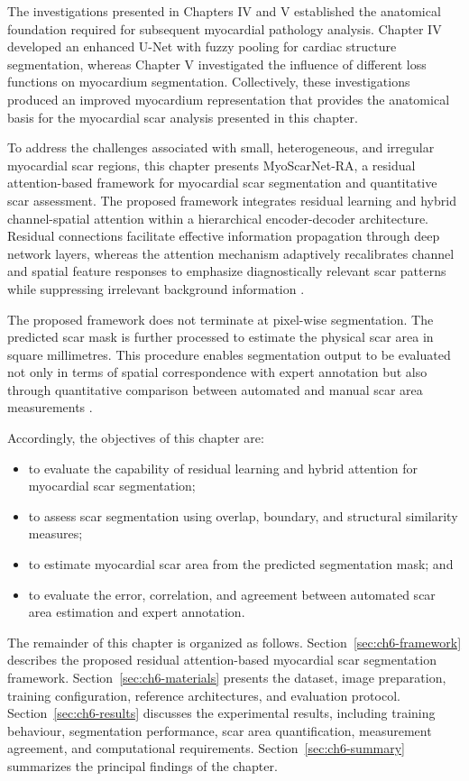 The investigations presented in Chapters IV and V established the anatomical foundation required for subsequent myocardial pathology analysis. Chapter IV developed an enhanced U-Net with fuzzy pooling for cardiac structure segmentation, whereas Chapter V investigated the influence of different loss functions on myocardium segmentation. Collectively, these investigations produced an improved myocardium representation that provides the anatomical basis for the myocardial scar analysis presented in this chapter.

To address the challenges associated with small, heterogeneous, and irregular myocardial scar regions, this chapter presents MyoScarNet-RA, a residual attention-based framework for myocardial scar segmentation and quantitative scar assessment. The proposed framework integrates residual learning and hybrid channel-spatial attention within a hierarchical encoder-decoder architecture. Residual connections facilitate effective information propagation through deep network layers, whereas the attention mechanism adaptively recalibrates channel and spatial feature responses to emphasize diagnostically relevant scar patterns while suppressing irrelevant background information \citep{He2016,Hu2018,Woo2018}.

The proposed framework does not terminate at pixel-wise segmentation. The predicted scar mask is further processed to estimate the physical scar area in square millimetres. This procedure enables segmentation output to be evaluated not only in terms of spatial correspondence with expert annotation but also through quantitative comparison between automated and manual scar area measurements \citep{Riandini2026Access}.

Accordingly, the objectives of this chapter are:

\begin{itemize}[nosep, leftmargin=*]
	\item to evaluate the capability of residual learning and hybrid attention for myocardial scar segmentation;
	\item to assess scar segmentation using overlap, boundary, and structural similarity measures;
	\item to estimate myocardial scar area from the predicted segmentation mask; and
	\item to evaluate the error, correlation, and agreement between automated scar area estimation and expert annotation.
\end{itemize}

The remainder of this chapter is organized as follows. Section~\ref{sec:ch6-framework} describes the proposed residual attention-based myocardial scar segmentation framework. Section~\ref{sec:ch6-materials} presents the dataset, image preparation, training configuration, reference architectures, and evaluation protocol. Section~\ref{sec:ch6-results} discusses the experimental results, including training behaviour, segmentation performance, scar area quantification, measurement agreement, and computational requirements. Section~\ref{sec:ch6-summary} summarizes the principal findings of the chapter.

